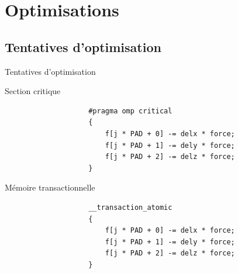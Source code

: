 \documentclass[9.5pt]{beamer}
\begin{document}
\section{Optimisations}
	\subsection{Tentatives d'optimisation}
		\begin{frame}[fragile]{Tentatives d'optimisation}
			\begin{block}{Section critique}
				\scriptsize
				\begin{verbatim}
					#pragma omp critical
					{
						f[j * PAD + 0] -= delx * force;
						f[j * PAD + 1] -= dely * force;
						f[j * PAD + 2] -= delz * force;
					}
				\end{verbatim}
			\end{block}

			\begin{block}{Mémoire transactionnelle}
				\scriptsize
				\begin{verbatim}
					__transaction_atomic
					{
						f[j * PAD + 0] -= delx * force;
						f[j * PAD + 1] -= dely * force;
						f[j * PAD + 2] -= delz * force;
					}
				\end{verbatim}
			\end{block}
\end{frame}
\end{document}

